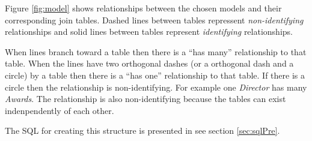 Figure \ref{fig:model} shows relationships between the chosen models and their
corresponding join tables. Dashed lines between tables repressent
\emph{non-identifying} relationships and
solid lines between tables represent \emph{identifying} relationships.

When lines branch toward a table then there is a ``has many'' relationship to
that table. When the lines have two orthogonal dashes (or a orthogonal dash and
a circle) by a table then there is a
``has one'' relationship to that table. If there is a circle then the
relationship is non-identifying.
For example one \emph{Director} has many \emph{Awards}. The relationship is
also non-identifying because the tables can exist indenpendently of each other.

The SQL for creating this structure is presented in see section \ref{sec:sqlPre}.


